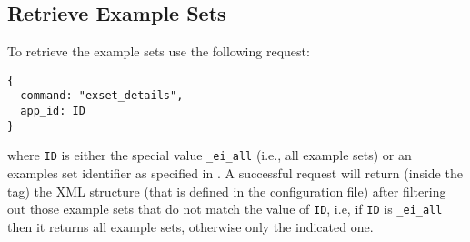 \subsection{Retrieve Example Sets}

To retrieve the example sets use the following request:

\bigskip
\begin{lstlisting}
{
  command: "exset_details",
  app_id: ID
}
\end{lstlisting}

\bigskip
\noindent
where \texttt{ID} is either the special value \texttt{\_ei\_all}
(i.e., all example sets) or an examples set identifier as specified in
.
%
A successful request will return (inside the  tag) the
XML structure  (that is defined in the
configuration file) after filtering out those example sets that do not
match the value of \texttt{ID}, i.e, if \texttt{ID} is
\texttt{\_ei\_all} then it returns all example sets, otherwise only
the indicated one.
